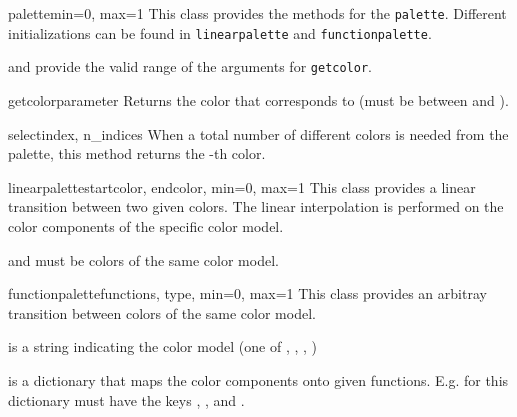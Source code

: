 \begin{classdesc}{palette}{min=0, max=1}
  This class provides the methods for the \verb|palette|. Different
  initializations can be found in \verb|linearpalette| and \verb|functionpalette|.

   and  provide the valid range of the arguments for
  \verb|getcolor|.

  \begin{funcdesc}{getcolor}{parameter}
    Returns the color that corresponds to  (must be between
     and ).
  \end{funcdesc}

  \begin{funcdesc}{select}{index, n\_indices}
    When a total number of  different colors is needed from the
    palette, this method returns the -th color.
  \end{funcdesc}

\end{classdesc}


\begin{classdesc}{linearpalette}{startcolor, endcolor, min=0, max=1}
  This class provides a linear transition between two given colors. The linear
  interpolation is performed on the color components of the specific color
  model.

   and  must be colors of the same color model.
\end{classdesc}

\begin{classdesc}{functionpalette}{functions, type, min=0, max=1}
  This class provides an arbitray transition between colors of the same
  color model.

   is a string indicating the color model (one of ,
  , , )

   is a dictionary that maps the color components onto given
  functions. E.g. for  this dictionary must have the keys
  , , and .

\end{classdesc}


